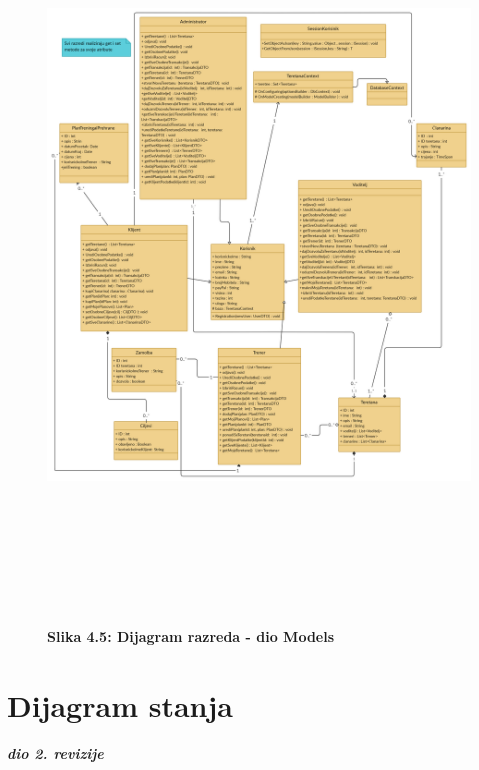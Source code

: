		\begin{figure}[!htb]
			\includegraphics[height= 20cm,width=1.2\textwidth]{dokumentacija/slike/models.jpg}
			\textbf{Slika 4.5: Dijagram razreda - dio Models}
		\end{figure}
		
		
		
		
		
		
		\eject
			
			
			
			\eject
		
		\section{Dijagram stanja}
			
			
			\textbf{\textit{dio 2. revizije}}\\
			

